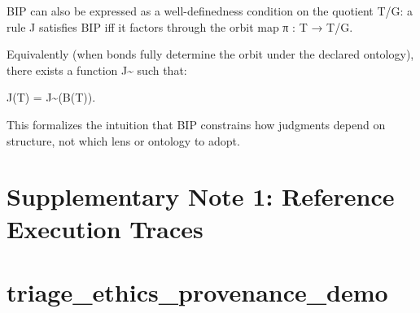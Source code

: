 \documentclass[12pt]{article}
\theoremstyle{plain}
\theoremstyle{definition}
\theoremstyle{remark}
\begin{document}
BIP can also be expressed as a well-definedness condition on the
quotient T/G: a rule J satisfies BIP iff it factors through the orbit
map π : T → T/G.

Equivalently (when bonds fully determine the orbit under the declared
ontology), there exists a function J\textasciitilde{} such that:

J(T) = J\textasciitilde(B(T)).

This formalizes the intuition that BIP constrains how judgments depend
on structure, not which lens or ontology to adopt.

\section{Supplementary Note 1: Reference Execution
Traces}\label{supplementary-note-1-reference-execution-traces}

\section{triage\_ethics\_provenance\_demo}\label{triage_ethics_provenance_demo}
\end{document}
